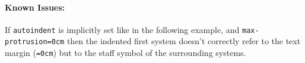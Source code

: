 \documentclass{scrartcl}
\begin{document}
\paragraph{Known Issues:}
If \texttt{autoindent} is implicitly set like in the following example, and
\texttt{max-protrusion=0cm} then the indented first system doesn't correctly
refer to the text margin (\texttt{=0cm}) but to the staff symbol of the
surrounding systems.

\end{document}
